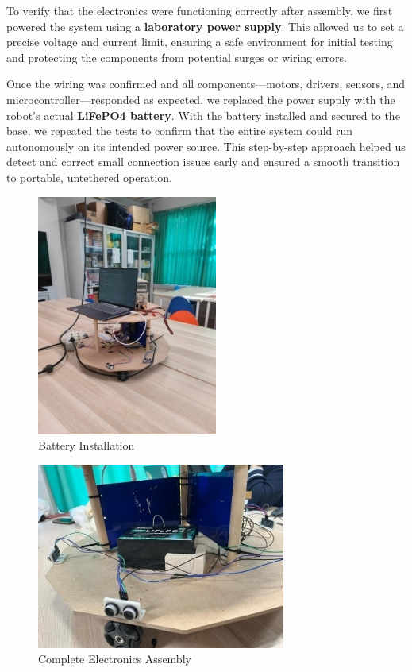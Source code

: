 To verify that the electronics were functioning correctly after assembly, we first powered the system using a \textbf{laboratory power supply}. This allowed us to set a precise voltage and current limit, ensuring a safe environment for initial testing and protecting the components from potential surges or wiring errors.

Once the wiring was confirmed and all components—motors, drivers, sensors, and microcontroller—responded as expected, we replaced the power supply with the robot's actual \textbf{LiFePO4 battery}. With the battery installed and secured to the base, we repeated the tests to confirm that the entire system could run autonomously on its intended power source. This step-by-step approach helped us detect and correct small connection issues early and ensured a smooth transition to portable, untethered operation.

\begin{figure}[H]
    \centering
    \includegraphics[width=0.6\linewidth]{../ReportMovementModule/images/Aspose.Words.728084da-df58-4b9d-a372-f65cffbdb23d.015.jpeg}
    \caption{Battery Installation}
\end{figure}

\begin{figure}[H]
    \centering
    \includegraphics[width=0.6\linewidth]{../ReportMovementModule/images/Aspose.Words.728084da-df58-4b9d-a372-f65cffbdb23d.016.jpeg}
    \caption{Complete Electronics Assembly}
\end{figure}

